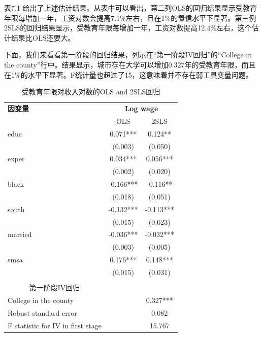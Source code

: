 \documentclass[cn,12pt,math=newtx,citestyle=gb7714-2015,bibstyle=gb7714-2015]{elegantbook}
\begin{document}
	表7.1 给出了上述估计结果。从表中可以看出，第二列OLS的回归结果显示受教育年限每增加一年，工资对数会提高7.1\%左右，且在1\%的置信水平下显著。第三例2SLS的回归结果显示，受教育年限每增加一年，工资对数提高12.4\%左右，这个估计结果比OLS还要大。
	
	下面，我们来看看第一阶段的回归结果，列示在“第一阶段IV回归”的“College in the county”行中。结果显示，城市存在大学可以增加0.327年的受教育年限，而且在1\%的水平下显著。F统计量也超过了15，这意味着并不存在弱工具变量问题。
	
	\begin{table}[htbp]\centering
		\scriptsize
		\caption{受教育年限对收入对数的OLS and 2SLS回归}
		\label{2sls_1}
		\begin{center}
			\begin{threeparttable}
				\begin{tabular}{l*{2}{c}}
					\toprule
					\multicolumn{1}{l}{\textbf{因变量}}&
					\multicolumn{2}{c}{\textbf{Log wage}}\\
					\multicolumn{1}{c}{}&
					\multicolumn{1}{c}{OLS}&
					\multicolumn{1}{c}{2SLS}\\
					\midrule
					educ                &       0.071***&       0.124** \\
					&     (0.003)   &     (0.050)   \\
					exper               &       0.034***&       0.056***\\
					&     (0.002)   &     (0.020)   \\
					black               &      -0.166***&      -0.116** \\
					&     (0.018)   &     (0.051)   \\
					south               &      -0.132***&      -0.113***\\
					&     (0.015)   &     (0.023)   \\
					married             &      -0.036***&      -0.032***\\
					&     (0.003)   &     (0.005)   \\
					smsa                &       0.176***&       0.148***\\
					&     (0.015)   &     (0.031)   \\
					\\
					\midrule
					\multicolumn{1}{c}{第一阶段IV回归}\\
					College in the county&               &       0.327***\\
					Robust standard error &               &       0.082   \\
					F statistic for IV in first stage&               &      15.767   \\

\end{tabular}
\end{threeparttable}
\end{center}
\end{table}
\end{document}
